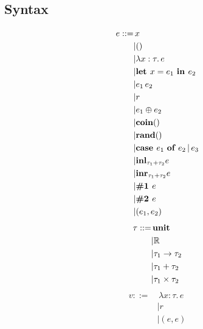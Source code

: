 \documentclass{article}
\begin{document}
		\subsection{Syntax}
		\begin{multicols}{2}
			\begin{equation*}
				\begin{split}
					e ::=
					&\, x \\
					&| () \\
					&| \lambda x : \tau.\, e \\
					&| \text{\bf let } x = e_1 \text{ \bf in } e_2 \\
					&| e_1\, e_2 \\
					&| r \\
					&| e_1 \oplus e_2 \\
					&| {\bf coin()} \\
					&| {\bf rand()} \\
					&| \text{\bf case } e_1 \text{ \bf of } e_2 \,|\, e_3 \\
					&| {\bf inl}_{\tau_1 + \tau_2} e \\
					&| {\bf inr}_{\tau_1 + \tau_2} e \\
					&| \text{\bf \#1 } e \\
					&| \text{\bf \#2 } e \\
					&| (e_1, e_2) \\
				\end{split}
			\end{equation*}			
		\begin{equation*}
			\begin{split}
				\tau ::=
				&\, {\bf unit} \\
				&| \mathbb{R} \\
				&| \tau_1 \to \tau_2 \\
				&| \tau_1 + \tau_2 \\
				&| \tau_1 \times \tau_2 \\
			\end{split}
		\end{equation*}
		\begin{equation*}
			\begin{split}
				v ::=
				&\, \lambda x:\tau.\, e \\
				&| r \\
				&| (e, e) \\
			\end{split}
		\end{equation*}
		\begin{equation*}
			\begin{split}

\end{split}
\end{equation*}
\end{multicols}
\end{document}
